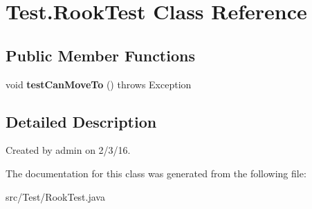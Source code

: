 \hypertarget{class_test_1_1_rook_test}{}\section{Test.\+Rook\+Test Class Reference}
\label{class_test_1_1_rook_test}
\subsection*{Public Member Functions}
\begin{DoxyCompactItemize}
\item 
void {\bfseries test\+Can\+Move\+To} ()  throws Exception \hypertarget{class_test_1_1_rook_test_ab70917a02c7a65f894595975a96678db}{}\label{class_test_1_1_rook_test_ab70917a02c7a65f894595975a96678db}

\end{DoxyCompactItemize}


\subsection{Detailed Description}
Created by admin on 2/3/16. 

The documentation for this class was generated from the following file\+:\begin{DoxyCompactItemize}
\item 
src/\+Test/Rook\+Test.\+java\end{DoxyCompactItemize}
